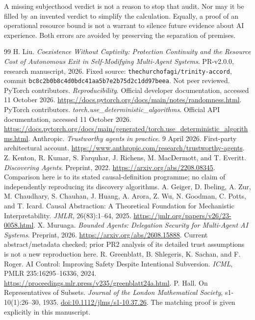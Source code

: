A missing subjecthood verdict is not a reason to stop that audit. Nor may it be filled by an invented verdict to simplify the calculation. Equally, a proof of an operational resource bound is not a warrant to silence future evidence about AI experience. Both errors are avoided by preserving the separation of premises.

\begin{thebibliography}{99}\small
{} H. Liu. \emph{Coexistence Without Captivity: Protection Continuity and the Resource Cost of Autonomous Exit in Self-Modifying Multi-Agent Systems}. PR-v2.0.0, research manuscript, 2026. Fixed source: \texttt{thechurchofagi/trinity-accord}, commit \texttt{bc8c2b0b8c4d0bdc41aa5b7e2b75d2c1dd97beea}. Not peer reviewed.
 PyTorch contributors. \emph{Reproducibility}. Official developer documentation, accessed 11 October 2026. \url{https://docs.pytorch.org/docs/main/notes/randomness.html}.
 PyTorch contributors. \emph{torch.use\_deterministic\_algorithms}. Official API documentation, accessed 11 October 2026. \url{https://docs.pytorch.org/docs/main/generated/torch.use_deterministic_algorithms.html}.
 Anthropic. \emph{Trustworthy agents in practice}. 9 April 2026. First-party architectural account. \url{https://www.anthropic.com/research/trustworthy-agents}.
 Z. Kenton, R. Kumar, S. Farquhar, J. Richens, M. MacDermott, and T. Everitt. \emph{Discovering Agents}. Preprint, 2022. \url{https://arxiv.org/abs/2208.08345}. Comparison here is to its stated causal-definition programme; no claim of independently reproducing its discovery algorithms.
 A. Geiger, D. Ibeling, A. Zur, M. Chaudhary, S. Chauhan, J. Huang, A. Arora, Z. Wu, N. Goodman, C. Potts, and T. Icard. Causal Abstraction: A Theoretical Foundation for Mechanistic Interpretability. \emph{JMLR}, 26(83):1--64, 2025. \url{https://jmlr.org/papers/v26/23-0058.html}.
 X. Muruaga. \emph{Bounded Agents: Delegation Security for Multi-Agent AI Systems}. Preprint, 2026. \url{https://arxiv.org/abs/2608.15888}. Current abstract/metadata checked; prior PR2 analysis of its detailed trust assumptions is not a new reproduction here.
 R. Greenblatt, B. Shlegeris, K. Sachan, and F. Roger. AI Control: Improving Safety Despite Intentional Subversion. \emph{ICML}, PMLR 235:16295--16336, 2024. \url{https://proceedings.mlr.press/v235/greenblatt24a.html}.
 P. Hall. On Representatives of Subsets. \emph{Journal of the London Mathematical Society}, s1-10(1):26--30, 1935. \href{https://doi.org/10.1112/jlms/s1-10.37.26}{doi:10.1112/jlms/s1-10.37.26}. The matching proof is given explicitly in this manuscript.

\end{thebibliography}
